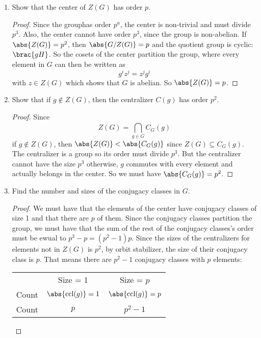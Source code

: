 \documentclass{article}
\begin{document}
\begin{enumerate}
	\item Show that the center of $Z(G)$ has order $p$.
		\begin{proof}
			Since the grouphas order $p^{a}$, the center is non-trivial and must divide $p^{3}$. Also, the center cannot have order $p^{3}$, since the group is non-abelian. If $\abs{Z(G)} = p^{2}$, then $\abs{G/Z(G)} = p$ and the quotient group is cyclic: $\brac{gH}$. So the cosets of the center partition the group, where every element in $G$ can then be written as 
			\begin{equation*}
				g^{i}z^{j} = z^{j}g^{i}
			\end{equation*}
			with $z \in Z(G)$ which shows that $G$ is abelian. So $\abs{Z(G)} = p$.
		\end{proof}

	\item Show that if $g \notin Z(G)$, then the centralizer $C(g)$ has order $p^{2}$.
		\begin{proof}
			Since
			\begin{equation*}
				Z(G) = \bigcap_{g \in G}^{} C_{G}(g)
			\end{equation*}
			if $g \notin Z(G)$, then $\abs{Z(G)} < \abs{C_{G}(g)}$ since $Z(G) \subseteq  C_{G}(g)$. The centralizer is a group so its order must divide $p^{3}$. But the centralizer cannot have the size $p^{3}$ otherwise, $g$ commutes with every element and actually belongs in the center. So we must have $\abs{C_{G}(g)} = p^{2}$.
		\end{proof}

	\item Find the number and sizes of the conjugacy classes in $G$.
		\begin{proof}
			We must have that the elements of the center have conjugacy classes of size 1 and that there are $p$ of them. Since the conjugacy classes partition the group, we must have that the sum of the rest of the conjugacy classes's order must be ewual to $p^{3} - p = (p^{2} - 1)p$. Since the sizes of the centralizers for elements not in $Z(G)$ is $p^{2}$, by orbit stabilizer, the size of their conjugacy class is $p$. That means there are $p^{2} - 1$ conjugacy classes with $p$ elements:
			\begin{center}
				\begin{tabular}{ c c c }
				 & Size = 1 & Size = $p$ \\
				Count & $\abs{\text{ccl}(g)} = 1$ & $\abs{\text{ccl}(g)} = p$ \\
				Count & $p$ & $p^{2} - 1$ \\
				\end{tabular}
			\end{center}	
		\end{proof}
\end{enumerate}
\end{document}
